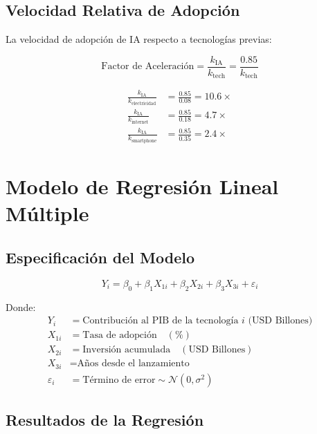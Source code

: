 \documentclass{article}
\begin{document}
\subsection{Velocidad Relativa de Adopción}

La velocidad de adopción de IA respecto a tecnologías previas:

\begin{equation}
\text{Factor de Aceleración} = \frac{k_{\text{IA}}}{k_{\text{tech}}} = \frac{0.85}{k_{\text{tech}}}
\end{equation}

\begin{align}
\frac{k_{\text{IA}}}{k_{\text{electricidad}}} &= \frac{0.85}{0.08} = 10.6\times \\
\frac{k_{\text{IA}}}{k_{\text{internet}}} &= \frac{0.85}{0.18} = 4.7\times \\
\frac{k_{\text{IA}}}{k_{\text{smartphone}}} &= \frac{0.85}{0.35} = 2.4\times
\end{align}

\section{Modelo de Regresión Lineal Múltiple}

\subsection{Especificación del Modelo}

\begin{equation}
Y_i = \beta_0 + \beta_1 X_{1i} + \beta_2 X_{2i} + \beta_3 X_{3i} + \varepsilon_i
\end{equation}

Donde:
\begin{align}
Y_i &= \text{Contribución al PIB de la tecnología } i \text{ (USD Billones)} \\
X_{1i} &= \text{Tasa de adopción} \quad (\%) \\
X_{2i} &= \text{Inversión acumulada} \quad (\text{USD Billones}) \\
X_{3i} &= \text{Años desde el lanzamiento} \\
\varepsilon_i &= \text{Término de error} \sim \mathcal{N}(0, \sigma^2)
\end{align}

\subsection{Resultados de la Regresión}
\end{document}
